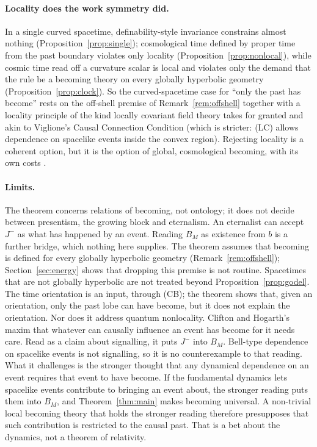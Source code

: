 \documentclass[11pt]{article}
\theoremstyle{definition}
\newcommand{\Jm}{J^{-}}
\begin{document}
\paragraph{Locality does the work symmetry did.} In a single curved spacetime,
definability-style invariance constrains almost nothing
(Proposition~\ref{prop:single}); cosmological time defined by proper time
from the past boundary violates only locality
(Proposition~\ref{prop:nonlocal}), while cosmic time read off a curvature
scalar is local and violates only the demand that the rule be a becoming
theory on every globally hyperbolic geometry
(Proposition~\ref{prop:clock}). So the
curved-spacetime case for ``only the past has become'' rests on the off-shell
premise of Remark~\ref{rem:offshell} together with a locality
principle of the kind locally covariant field theory takes for granted and
akin to Viglione's Causal Connection Condition \citep{Viglione2026} (which is
stricter: (LC) allows dependence on spacelike events inside the convex region). Rejecting
locality is a coherent option, but it is the option of global, cosmological
becoming, with its own costs \citep{Dieks2006,Viglione2026}.

\paragraph{Limits.} The theorem concerns relations of becoming, not
ontology; it does not decide between presentism, the growing block and
eternalism. An eternalist can accept $\Jm$ as what has happened by an event.
Reading $B_M$ as existence from $b$ is a further bridge, which nothing here
supplies. The theorem assumes that becoming is defined for every globally hyperbolic
geometry (Remark~\ref{rem:offshell}); Section~\ref{sec:energy} shows that
dropping this premise is not routine. Spacetimes that are not globally hyperbolic are not treated beyond
Proposition~\ref{prop:godel}. The time orientation is an input, through (CB);
the theorem shows that, given an orientation, only the past lobe can have
become, but it does not explain the orientation. Nor does it address quantum
nonlocality. Clifton and Hogarth's maxim that whatever can causally influence
an event has become for it \citep[p.~364]{CH1995} needs care. Read as a claim
about signalling, it puts $\Jm$ into $B_M$. Bell-type dependence on spacelike
events is not signalling, so it is no counterexample to that reading. What it
challenges is the stronger thought that any dynamical dependence on an event
requires that event to have become. If the fundamental dynamics lets spacelike
events contribute to bringing an event about, the stronger reading puts them
into $B_M$, and Theorem~\ref{thm:main} makes becoming universal. A non-trivial
local becoming theory that holds the stronger reading therefore presupposes that
such contribution is restricted to the causal past. That is a bet about the
dynamics, not a theorem of relativity.
\end{document}
